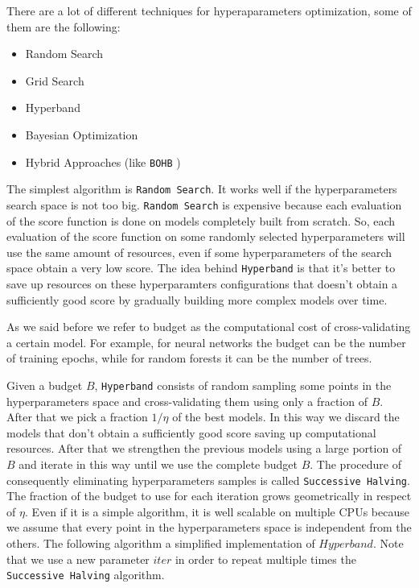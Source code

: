 \documentclass[11pt, a4paper]{article}
\begin{document}
  There are a lot of different techniques for hyperaparameters optimization, some of them are the following:
  \begin{itemize}
    \item Random Search
    \item Grid Search
    \item Hyperband
    \item Bayesian Optimization
    \item Hybrid Approaches (like \texttt{BOHB} \cite{bohb})
  \end{itemize}

  The simplest algorithm is \texttt{Random Search}. It works well if the hyperparameters search space is not too big. \texttt{Random Search} is expensive because each evaluation of the score function is done on models completely built from scratch. So, each evaluation of the score function on some randomly selected hyperparameters will use the same amount of resources, even if some hyperparameters of the search space obtain a very low score. The idea behind \texttt{Hyperband} is that it's better to save up resources on these hyperparamters configurations that doesn't obtain a sufficiently good score by gradually building more complex models over time.
  
  As we said before we refer to budget as the computational cost of cross-validating a certain model. For example, for neural networks the budget can be the number of training epochs, while for random forests it can be the number of trees.

  Given a budget $B$, \texttt{Hyperband} consists of random sampling some points in the hyperparameters space and cross-validating them using only a fraction of $B$. After that we pick a fraction $1/\eta$ of the best models. In this way we discard the models that don't obtain a sufficiently good score saving up computational resources. After that we strengthen the previous models using a large portion of $B$ and iterate in this way until we use the complete budget $B$. The procedure of consequently eliminating hyperparameters samples is called \texttt{Successive Halving}.  The fraction of the budget to use for each iteration grows geometrically in respect of $\eta$.
  Even if it is a simple algorithm, it is well scalable on multiple CPUs because we assume that every point in the hyperparameters space is independent from the others. The following algorithm a simplified implementation of $Hyperband$. Note that we use a new parameter $iter$ in order to repeat multiple times the \texttt{Successive Halving} algorithm.
  
\end{document}
